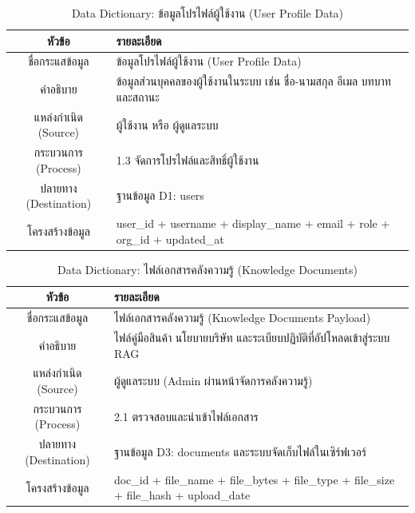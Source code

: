 \begin{table}[htbp]
\centering
\caption{Data Dictionary: ข้อมูลโปรไฟล์ผู้ใช้งาน (User Profile Data)}
\label{tab3:df_profile}
\begin{tabularx}{\textwidth}{| c | L |}
\hline
\textbf{หัวข้อ} & \textbf{รายละเอียด} \\ \hline
ชื่อกระแสข้อมูล & ข้อมูลโปรไฟล์ผู้ใช้งาน (User Profile Data) \\ \hline
คำอธิบาย & ข้อมูลส่วนบุคคลของผู้ใช้งานในระบบ เช่น ชื่อ-นามสกุล อีเมล บทบาท และสถานะ \\ \hline
แหล่งกำเนิด (Source) & ผู้ใช้งาน หรือ ผู้ดูแลระบบ \\ \hline
กระบวนการ (Process) & 1.3 จัดการโปรไฟล์และสิทธิ์ผู้ใช้งาน \\ \hline
ปลายทาง (Destination) & ฐานข้อมูล D1: users \\ \hline
โครงสร้างข้อมูล & user\_id + username + display\_name + email + role + org\_id + updated\_at \\ \hline
\end{tabularx}
\end{table}

\begin{table}[htbp]
\centering
\caption{Data Dictionary: ไฟล์เอกสารคลังความรู้ (Knowledge Documents)}
\label{tab3:df_doc}
\begin{tabularx}{\textwidth}{| c | L |}
\hline
\textbf{หัวข้อ} & \textbf{รายละเอียด} \\ \hline
ชื่อกระแสข้อมูล & ไฟล์เอกสารคลังความรู้ (Knowledge Documents Payload) \\ \hline
คำอธิบาย & ไฟล์คู่มือสินค้า นโยบายบริษัท และระเบียบปฏิบัติที่อัปโหลดเข้าสู่ระบบ RAG \\ \hline
แหล่งกำเนิด (Source) & ผู้ดูแลระบบ (Admin ผ่านหน้าจัดการคลังความรู้) \\ \hline
กระบวนการ (Process) & 2.1 ตรวจสอบและนำเข้าไฟล์เอกสาร \\ \hline
ปลายทาง (Destination) & ฐานข้อมูล D3: documents และระบบจัดเก็บไฟล์ในเซิร์ฟเวอร์ \\ \hline
โครงสร้างข้อมูล & doc\_id + file\_name + file\_bytes + file\_type + file\_size + file\_hash + upload\_date \\ \hline
\end{tabularx}
\end{table}

